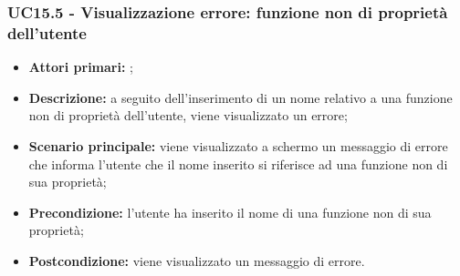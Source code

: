 \subsubsection{UC15.5 - Visualizzazione errore: funzione non di proprietà dell’utente}
\begin{itemize}
	\item \textbf{Attori primari:} \us{};
	\item \textbf{Descrizione:} a seguito dell’inserimento di un nome relativo a una funzione non di proprietà dell’utente, viene visualizzato un errore;
	\item \textbf{Scenario principale:} viene visualizzato a schermo un messaggio di errore che informa l’utente che il nome inserito si riferisce ad una funzione non di sua proprietà;
	\item \textbf{Precondizione:} l’utente ha inserito il nome di una funzione non di sua proprietà; 
	\item \textbf{Postcondizione:} viene visualizzato un messaggio di errore. 
\end{itemize}